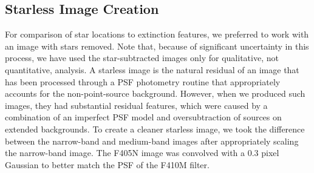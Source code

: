 \documentclass[times,astrosymb,twocolumn]{aastex631}
\def\rr#1{#1}
\begin{document}



\subsection{Starless Image Creation}
\label{sec:starsub}
For comparison of star locations to extinction features, we preferr\rr{ed} to work with an image with stars removed.
\rr{Note that, because of significant uncertainty in this process, we have used the star-subtracted images only for qualitative, not quantitative, analysis.}
A starless image is the natural residual of an image that has been processed through a PSF photometry routine that appropriately accounts for the non-point-source background.
However, \rr{when we produced} such images, \rr{they had} substantial residual features\rr{, which were caused by a combination of an imperfect PSF model and oversubtraction of sources on extended backgrounds}.
To create a cleaner starless image, we \rr{took} the difference between the narrow-band and medium-band images after appropriately scaling the narrow-band image.
The F405N image was convolved with a 0.3 pixel Gaussian to better match the PSF of the F410M filter.
\end{document}
